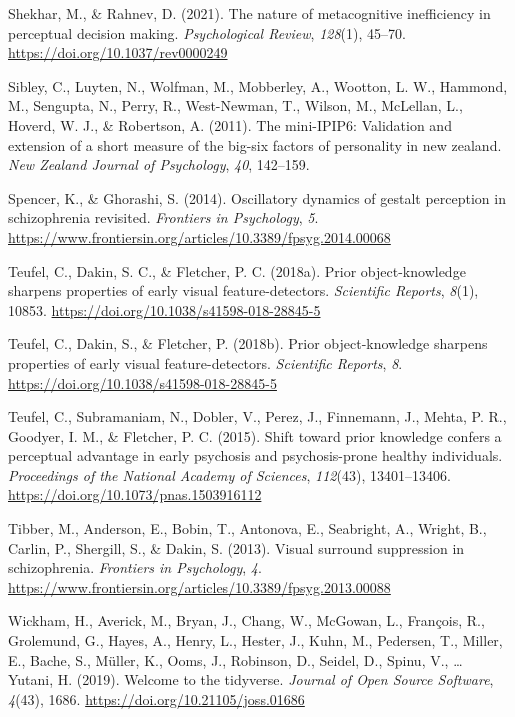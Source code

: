\documentclass[
  man,floatsintext]{apa6}
\newlength{\cslhangindent}
\newlength{\cslentryspacingunit} %
\newenvironment{CSLReferences}[2] %
 {%
  \setlength{\parindent}{0pt}
  \ifodd #1
  \let\oldpar\par
  \def\par{\hangindent=\cslhangindent\oldpar}
  \fi
  \setlength{\parskip}{#2\cslentryspacingunit}
 }%
 {}
\begin{document}
\begin{CSLReferences}{1}{0}
\leavevmode{}%
Shekhar, M., \& Rahnev, D. (2021). The nature of metacognitive inefficiency in perceptual decision making. \emph{Psychological Review}, \emph{128}(1), 45--70. \url{https://doi.org/10.1037/rev0000249}

\leavevmode{}%
Sibley, C., Luyten, N., Wolfman, M., Mobberley, A., Wootton, L. W., Hammond, M., Sengupta, N., Perry, R., West-Newman, T., Wilson, M., McLellan, L., Hoverd, W. J., \& Robertson, A. (2011). The mini-IPIP6: Validation and extension of a short measure of the big-six factors of personality in new zealand. \emph{New Zealand Journal of Psychology}, \emph{40}, 142--159.

\leavevmode{}%
Spencer, K., \& Ghorashi, S. (2014). Oscillatory dynamics of gestalt perception in schizophrenia revisited. \emph{Frontiers in Psychology}, \emph{5}. \url{https://www.frontiersin.org/articles/10.3389/fpsyg.2014.00068}

\leavevmode{}%
Teufel, C., Dakin, S. C., \& Fletcher, P. C. (2018a). Prior object-knowledge sharpens properties of early visual feature-detectors. \emph{Scientific Reports}, \emph{8}(1), 10853. \url{https://doi.org/10.1038/s41598-018-28845-5}

\leavevmode{}%
Teufel, C., Dakin, S., \& Fletcher, P. (2018b). Prior object-knowledge sharpens properties of early visual feature-detectors. \emph{Scientific Reports}, \emph{8}. \url{https://doi.org/10.1038/s41598-018-28845-5}

\leavevmode{}%
Teufel, C., Subramaniam, N., Dobler, V., Perez, J., Finnemann, J., Mehta, P. R., Goodyer, I. M., \& Fletcher, P. C. (2015). Shift toward prior knowledge confers a perceptual advantage in early psychosis and psychosis-prone healthy individuals. \emph{Proceedings of the National Academy of Sciences}, \emph{112}(43), 13401--13406. \url{https://doi.org/10.1073/pnas.1503916112}

\leavevmode{}%
Tibber, M., Anderson, E., Bobin, T., Antonova, E., Seabright, A., Wright, B., Carlin, P., Shergill, S., \& Dakin, S. (2013). Visual surround suppression in schizophrenia. \emph{Frontiers in Psychology}, \emph{4}. \url{https://www.frontiersin.org/articles/10.3389/fpsyg.2013.00088}

\leavevmode{}%
Wickham, H., Averick, M., Bryan, J., Chang, W., McGowan, L., François, R., Grolemund, G., Hayes, A., Henry, L., Hester, J., Kuhn, M., Pedersen, T., Miller, E., Bache, S., Müller, K., Ooms, J., Robinson, D., Seidel, D., Spinu, V., \ldots{} Yutani, H. (2019). Welcome to the tidyverse. \emph{Journal of Open Source Software}, \emph{4}(43), 1686. \url{https://doi.org/10.21105/joss.01686}


\end{CSLReferences}
\end{document}
